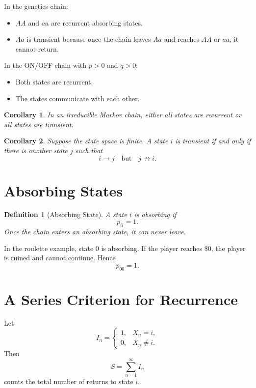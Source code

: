 \documentclass[12pt,a4paper]{article}
\theoremstyle{lecturestyle}
\newtheorem{definition}{Definition}
\newtheorem{corollary}{Corollary}
\begin{document}
In the genetics chain:
\begin{itemize}[leftmargin=1.2cm]
    \item $AA$ and $aa$ are recurrent absorbing states.
    \item $Aa$ is transient because once the chain leaves $Aa$ and reaches $AA$ or $aa$, it cannot return.
\end{itemize}

In the ON/OFF chain with $p>0$ and $q>0$:
\begin{itemize}[leftmargin=1.2cm]
    \item Both states are recurrent.
    \item The states communicate with each other.
\end{itemize}

\begin{corollary}
In an irreducible Markov chain, either all states are recurrent or all states are transient.
\end{corollary}

\begin{corollary}
Suppose the state space is finite. A state $i$ is transient if and only if there is another state $j$ such that
\[
i\to j
\quad\text{but}\quad
j\nrightarrow i.
\]
\end{corollary}

\section{Absorbing States}

\begin{definition}[Absorbing State]
A state $i$ is absorbing if
\[
p_{ii}=1.
\]
Once the chain enters an absorbing state, it can never leave.
\end{definition}

In the roulette example, state $0$ is absorbing. If the player reaches \$0, the player is ruined and cannot continue. Hence
\[
p_{00}=1.
\]

\section{A Series Criterion for Recurrence}

Let
\[
I_n=
\begin{cases}
1, & X_n=i,\\
0, & X_n\neq i.
\end{cases}
\]
Then
\[
S=\sum_{n=1}^{\infty}I_n
\]
counts the total number of returns to state $i$.
\end{document}
